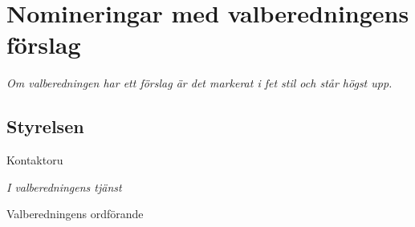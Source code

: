 \documentclass[10pt]{article}
\begin{document}
\section{Nomineringar med valberedningens förslag}
\emph{Om valberedningen har ett förslag är det markerat i fet stil och står högst upp.}


\subsection{Styrelsen}

\begin{vallista}
    
    \begin{post}{Kontaktor}{u}
    \end{post}
  
    
\end{vallista}

\begin{signatures}{1}
\emph{I valberedningens tjänst}
\signature{Axel Voss}{Valberedningens ordförande}
\end{signatures}
\end{document}
